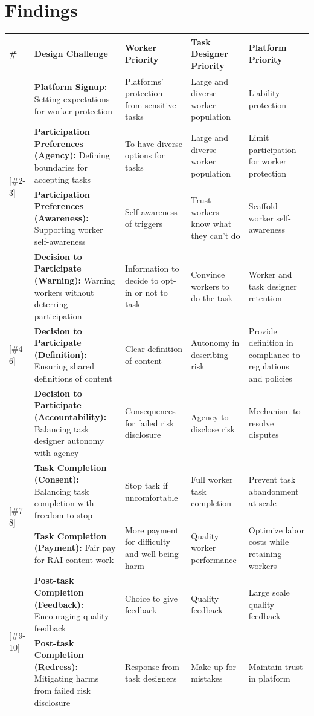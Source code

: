 \section{ Findings}
\small
\begin{longtable}{|p{0.7cm}|p{5cm}|p{3cm}|p{3cm}|p{3cm}|}
\hline
\textbf{\#} & \textbf{Design Challenge} & \textbf{Worker Priority} & \textbf{Task Designer Priority} & \textbf{Platform Priority}\\
\hline
\endhead
[\#1] & \textbf{Platform Signup:} Setting expectations for worker protection & Platforms' protection from sensitive tasks & Large and diverse worker population & Liability protection \\
\hline
\multirow{2}{*}{[\#2-3]} & \textbf{Participation Preferences (Agency):} Defining boundaries for accepting tasks & To have diverse options for tasks & Large and diverse worker population & Limit participation for worker protection \\
 & \textbf{Participation Preferences (Awareness):} Supporting worker self-awareness & Self-awareness of triggers & Trust workers know what they can't do & Scaffold worker self-awareness \\
\hline
\multirow{3}{*}{[\#4-6]} & \textbf{Decision to Participate (Warning):} Warning workers without deterring participation & Information to decide to opt-in or not to task & Convince workers to do the task & Worker and task designer retention \\
 & \textbf{Decision to Participate (Definition):} Ensuring shared definitions of content & Clear definition of content & Autonomy in describing risk & Provide definition in compliance to regulations and policies \\
 & \textbf{Decision to Participate (Accountability):} Balancing task designer autonomy with agency & Consequences for failed risk disclosure & Agency to disclose risk & Mechanism to resolve disputes \\
\hline
\multirow{2}{*}{[\#7-8]} & \textbf{Task Completion (Consent):} Balancing task completion with freedom to stop & Stop task if uncomfortable & Full worker task completion & Prevent task abandonment at scale \\
 & \textbf{Task Completion (Payment):} Fair pay for RAI content work & More payment for difficulty and well-being harm & Quality worker performance & Optimize labor costs while retaining workers \\
\hline
\multirow{2}{*}{[\#9-10]} & \textbf{Post-task Completion (Feedback):} Encouraging quality feedback & Choice to give feedback & Quality feedback & Large scale quality feedback \\
& \textbf{Post-task Completion (Redress):} Mitigating harms from failed risk disclosure & Response from task designers & Make up for mistakes & Maintain trust in platform \\
\hline
\end{longtable}
\normalsize


